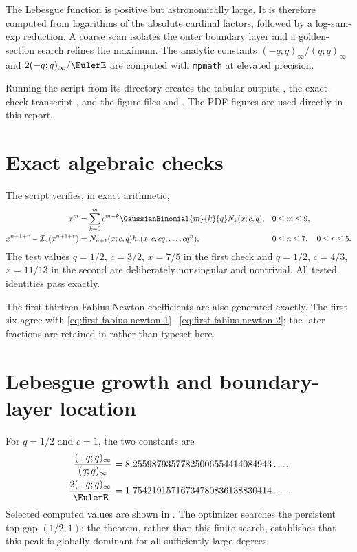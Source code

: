 \documentclass[11pt,oneside]{book}
\numberwithin{equation}{chapter}
\theoremstyle{definition}
\theoremstyle{remark}
\newcommand{\Interp}{\mathcal I}
\begin{document}
The Lebesgue function is positive but astronomically large.  It is therefore
computed from logarithms of the absolute cardinal factors, followed by a
log-sum-exp reduction.  A coarse scan isolates the outer boundary layer and
a golden-section search refines the maximum.  The analytic constants
$(-q;q)_\infty/(q;q)_\infty$ and $2(-q;q)_\infty/\EulerE$ are computed with
\texttt{mpmath} at elevated precision.

Running the script from its directory creates the tabular outputs
, the exact-check transcript
, and the figure files
 and .  The PDF figures are used
directly in this report.

\section{Exact algebraic checks}

The script verifies, in exact arithmetic,
\begin{align}
 x^m&=\sum_{k=0}^{m}c^{m-k}\GaussianBinomial{m}{k}{q}N_k(x;c,q),
 &&0\le m\le9,
 \label{eq:numeric-check-basis}\\
 x^{n+1+r}-\Interp_n(x^{n+1+r})
 &=N_{n+1}(x;c,q)h_r(x,c,cq,\ldots,cq^n),
 &&0\le n\le7,
 \quad0\le r\le5.
 \label{eq:numeric-check-residual}
\end{align}
The test values $q=1/2$, $c=3/2$, $x=7/5$ in the first check and
$q=1/2$, $c=4/3$, $x=11/13$ in the second are deliberately nonsingular and
nontrivial.  All tested identities pass exactly.

The first thirteen Fabius Newton coefficients are also generated exactly.
The first six agree with \eqref{eq:first-fabius-newton-1}--
\eqref{eq:first-fabius-newton-2}; the later fractions are retained in
 rather than typeset here.

\section{Lebesgue growth and boundary-layer location}

For $q=1/2$ and $c=1$, the two constants are
\begin{align}
 \frac{(-q;q)_\infty}{(q;q)_\infty}
 &=8.25598793577825006554414084943\ldots,
 \label{eq:numeric-endpoint-constant}\\
 \frac{2(-q;q)_\infty}{\EulerE}
 &=1.75421915716734780836138830414\ldots.
 \label{eq:numeric-global-prefactor}
\end{align}
Selected computed values are shown in .  The
optimizer searches the persistent top gap $(1/2,1)$; the theorem, rather
than this finite search, establishes that this peak is globally dominant for
all sufficiently large degrees.
\end{document}
